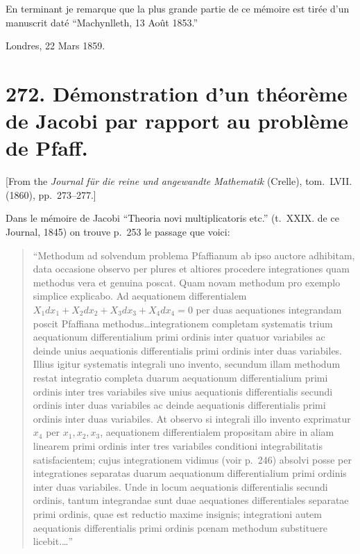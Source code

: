 \documentclass[11pt,a4paper]{book}
\begin{document}
En terminant je remarque que la plus grande partie de ce m\'{e}moire est tir\'{e}e d'un
manuscrit dat\'{e} ``Machynlleth, 13 Ao\^{u}t 1853.''

\begin{flushright}
Londres, 22 Mars 1859.
\end{flushright}

\newpage
\section*{272. D\'{e}monstration d'un th\'{e}or\`{e}me de Jacobi par rapport au probl\`{e}me de Pfaff.}

[From the \textit{Journal f\"{u}r die reine und angewandte Mathematik} (Crelle),
tom.~LVII. (1860), pp.~273--277.]
\vspace{0.5em}

Dans le m\'{e}moire de Jacobi ``Theoria novi multiplicatoris etc.'' (t.~XXIX. de ce
Journal, 1845) on trouve p.~253 le passage que voici:
\begin{quote}
``Methodum ad solvendum problema Pfaffianum ab ipso auctore adhibitam, data occasione
observo per plures et altiores procedere integrationes quam methodus vera et genuina
poscat. Quam novam methodum pro exemplo simplice explicabo. Ad aequationem differentialem
$X_{1}dx_{1}+X_{2}dx_{2}+X_{3}dx_{3}+X_{4}dx_{4}=0$ per duas aequationes integrandam
poscit Pfaffiana methodus\ldots integrationem completam systematis trium aequationum
differentialium primi ordinis inter quatuor variabiles ac deinde unius aequationis
differentialis primi ordinis inter duas variabiles. Illius igitur systematis integrali
uno invento, secundum illam methodum restat integratio completa duarum aequationum
differentialium primi ordinis inter tres variabiles sive unius aequationis differentialis
secundi ordinis inter duas variabiles ac deinde aequationis differentialis primi ordinis
inter duas variabiles. At observo si integrali illo invento exprimatur $x_{4}$ per
$x_{1}, x_{2}, x_{3}$, aequationem differentialem propositam abire in aliam linearem
primi ordinis inter tres variabiles conditioni integrabilitatis satisfacientem; cujus
integrationem vidimus (voir p.~246) absolvi posse per integrationes separatas duarum
aequationum differentialium primi ordinis inter duas variabiles. Unde in locum
aequationis differentialis secundi ordinis, tantum integrandae sunt duae aequationes
differentiales separatae primi ordinis, quae est reductio maxime insignis; integrationi
autem aequationis differentialis primi ordinis p\oe{}nam methodum substituere licebit.\ldots''
\end{quote}
\end{document}
